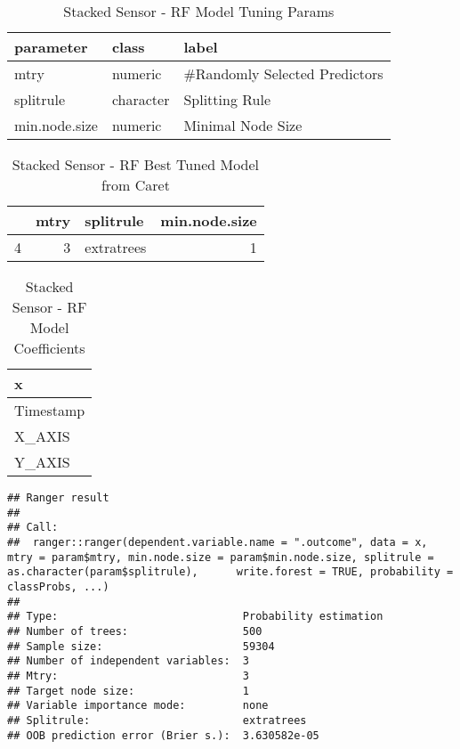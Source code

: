 \documentclass[]{article}
\begin{document}
\begin{table}[!h]

\caption{\label{tab:3g-stacked-sensor-rf-params}Stacked Sensor - RF Model Tuning Params}
\centering
\begin{tabular}[t]{lll}
\toprule
parameter & class & label\\
\midrule
mtry & numeric & \#Randomly Selected Predictors\\
splitrule & character & Splitting Rule\\
min.node.size & numeric & Minimal Node Size\\
\bottomrule
\end{tabular}
\end{table}

\begin{table}[!h]

\caption{\label{tab:3g-stacked-sensor-rf-params}Stacked Sensor - RF Best Tuned Model from Caret}
\centering
\begin{tabular}[t]{lrlr}
\toprule
  & mtry & splitrule & min.node.size\\
\midrule
4 & 3 & extratrees & 1\\
\bottomrule
\end{tabular}
\end{table}

\begin{table}[!h]

\caption{\label{tab:3g-stacked-sensor-rf-params}Stacked Sensor - RF Model Coefficients}
\centering
\begin{tabular}[t]{l}
\toprule
x\\
\midrule
Timestamp\\
X\_AXIS\\
Y\_AXIS\\
\bottomrule
\end{tabular}
\end{table}

\begin{verbatim}
## Ranger result
## 
## Call:
##  ranger::ranger(dependent.variable.name = ".outcome", data = x,      mtry = param$mtry, min.node.size = param$min.node.size, splitrule = as.character(param$splitrule),      write.forest = TRUE, probability = classProbs, ...) 
## 
## Type:                             Probability estimation 
## Number of trees:                  500 
## Sample size:                      59304 
## Number of independent variables:  3 
## Mtry:                             3 
## Target node size:                 1 
## Variable importance mode:         none 
## Splitrule:                        extratrees 
## OOB prediction error (Brier s.):  3.630582e-05
\end{verbatim}
\end{document}
